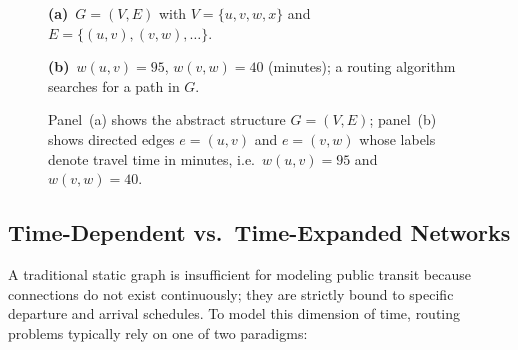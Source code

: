 \begin{figure}[htbp]
  \centering
  \begin{minipage}[t]{0.46\textwidth}
    \centering
    \par\medskip
    {\small\textbf{(a)}~$G=(V,E)$ with $V=\{u,v,w,x\}$ and $E=\{(u,v),(v,w),\ldots\}$.}
  \end{minipage}\hfill
  \begin{minipage}[t]{0.50\textwidth}
    \centering
    \par\medskip
    {\small\textbf{(b)}~$w(u,v)=95$, $w(v,w)=40$ (minutes); a routing algorithm searches for a path in $G$.}
  \end{minipage}
  \caption{Panel~(a) shows the abstract structure $G=(V,E)$; panel~(b) shows directed edges $e=(u,v)$ and $e=(v,w)$ whose labels denote travel time in minutes, i.e.\ $w(u,v)=95$ and $w(v,w)=40$.}
  \label{fig:graph_foundations}
\end{figure}

\subsection{Time-Dependent vs.\ Time-Expanded Networks}
\label{subsec:time_expanded}

A traditional static graph is insufficient for modeling public transit because connections do not exist continuously; they are strictly bound to specific departure and arrival schedules. To model this dimension of time, routing problems typically rely on one of two paradigms:

